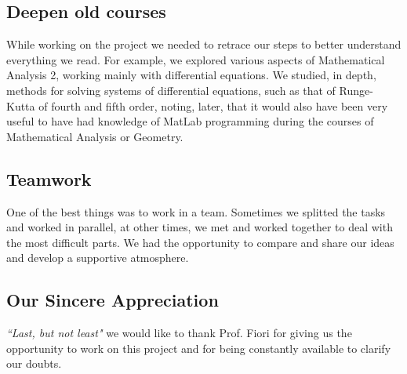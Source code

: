\documentclass[12pt, a4paper]{paper}
\begin{document}
\subsection{Deepen old courses}
While working on the project we needed to retrace our steps to better understand
everything we read. For example,  we explored various aspects of Mathematical Analysis 2, working  mainly with differential equations.
We studied, in depth, methods for solving systems of differential equations, such as
that of Runge-Kutta of fourth and fifth order, noting, later, that it would also have been very useful
to have had knowledge of MatLab programming during the courses of  Mathematical Analysis or Geometry.

\subsection{Teamwork}
One of the best things was to work in a team.
Sometimes we splitted the tasks and worked in parallel, at other times,
we met and worked together to deal with the most difficult parts.
We had the opportunity to compare and share our ideas and develop a supportive atmosphere.

\subsection{Our Sincere Appreciation}
\textit{“Last, but not least"} we would like to thank Prof. Fiori for giving us the opportunity to work on this 
project and for being  constantly available to clarify our doubts.



\end{document}
